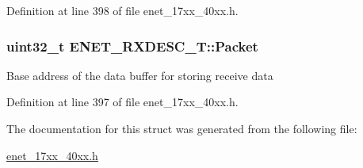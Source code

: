 Definition at line 398 of file enet\+\_\+17xx\+\_\+40xx.\+h.

\subsubsection[{\texorpdfstring{Packet}{Packet}}]{\setlength{\rightskip}{0pt plus 5cm}uint32\+\_\+t E\+N\+E\+T\+\_\+\+R\+X\+D\+E\+S\+C\+\_\+\+T\+::\+Packet}\hypertarget{structENET__RXDESC__T_a6fffb262a03d26e426701e6fba82a7ff}{}\label{structENET__RXDESC__T_a6fffb262a03d26e426701e6fba82a7ff}
Base address of the data buffer for storing receive data 

Definition at line 397 of file enet\+\_\+17xx\+\_\+40xx.\+h.



The documentation for this struct was generated from the following file\+:\begin{DoxyCompactItemize}
\item 
\hyperlink{enet__17xx__40xx_8h}{enet\+\_\+17xx\+\_\+40xx.\+h}\end{DoxyCompactItemize}
